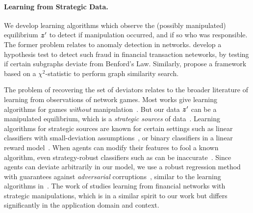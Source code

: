 

\paragraph{Learning from Strategic Data.} We develop learning algorithms which observe the (possibly manipulated) equilibrium $\bm{z}^\prime$ to detect if manipulation occurred, and if so who was responsible. The former problem relates to anomaly detection in networks. \citet{chen2022antibenford} develop a hypothesis test to detect such fraud in financial transaction neteworks, by testing if certain subgraphs deviate from Benford's Law. Similarly, \citet{agarwal2020chisel} propose a framework based on a $\chi^2$-statistic to perform graph similarity search. 

The problem of recovering the set of deviators relates to the broader literature of learning from observations of network games. Most works give learning algorithms for games {\em without} manipulation~\cite{irfan-2014,garg-2016,de2016learning,leng-2020-learning,rossi2022learning,jalan-2023}. But our data $\bm{z}^\prime$ can be a manipulated equilibrium, which is a {\em strategic sources} of data~\cite{zampetakis2020statistics}. Learning algorithms for strategic sources are known for certain settings such as linear classifiers with small-deviation assumptions~\citep{chen2020learning}, or binary classifiers in a linear reward model~\citep{harris2023strategic}. When agents can modify their features to fool a known algorithm, even strategy-robust classifiers such as \cite{hardt2016strategic} can be inaccurate~\cite{ghalme2021strategic}.  
Since agents can deviate arbitrarily in our model, we use a robust regression method with guarantees against {\em adversarial} corruptions~\citep{torrent-2015}, similar to the learning algorithms in~\citep{kapoor2019corruption,russo2023analysis}. The work of \citet{jalan-chakrabarti-2024} studies learning from financial networks with strategic manipulations, which is in a similar spirit to our work but differs significantly in the application domain and context. 



